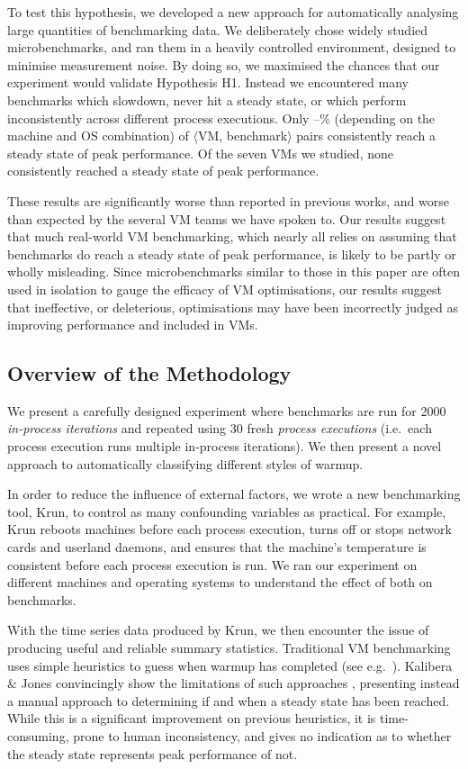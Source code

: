 \documentclass[acmlarge]{acmart}\settopmatter{printfolios=true}
\newcommand{\kalibera}{Kalibera \& Jones\xspace}
\newcommand{\krun}{Krun\xspace}
\newcommand{\vmbpair}{$\langle$VM, benchmark$\rangle$\xspace}
\begin{document}
To test this hypothesis, we developed a new approach for
automatically analysing large quantities of benchmarking data. We deliberately chose
widely studied microbenchmarks, and ran them in a heavily
controlled environment, designed to minimise measurement noise. By doing so, we
maximised the chances that our experiment would validate Hypothesis H1. Instead
we encountered many benchmarks which slowdown, never hit a steady
state, or which perform inconsistently across different process
executions. Only \mintwo--\maxtwo\% (depending on the machine and OS
combination) of \vmbpair pairs consistently reach a steady state of peak
performance. Of the seven VMs we studied, none consistently reached a steady
state of peak performance.

These results are significantly worse than reported in previous works, and worse
than expected by the several VM teams we have spoken to. Our results suggest
that much real-world VM benchmarking, which nearly all relies on assuming
that benchmarks do reach a steady state of peak performance, is likely to be partly or wholly
misleading. Since microbenchmarks similar to those in this paper are often used
in isolation to gauge the efficacy of VM optimisations, our results suggest that
ineffective, or deleterious, optimisations may have been incorrectly judged as
improving performance and included in VMs.


\subsection{Overview of the Methodology}

We present a carefully designed experiment where benchmarks are run for 2000
\emph{in-process iterations} and repeated using 30 fresh \emph{process
executions} (i.e.~each process execution runs multiple in-process iterations).
We then present a novel approach to automatically classifying
different styles of warmup.

In order to reduce the influence of external factors, we wrote a new
benchmarking tool, \krun, to control as many confounding variables as practical.
For example, \krun reboots machines before each process execution, turns off or stops network
cards and userland daemons, and ensures that the
machine's temperature is consistent before each process execution is run.
We ran our experiment on different machines and operating systems to understand
the effect of both on benchmarks.

With the time series data produced by \krun, we then encounter the issue of
producing useful and reliable summary statistics. Traditional VM benchmarking
uses simple heuristics to guess when warmup has completed (see
e.g.~\cite{georges07statistically}). \kalibera convincingly show the limitations of such approaches
\cite{kalibera13rigorous}, presenting instead a manual approach to determining
if and when a steady state has been reached. While this is a significant improvement on
previous heuristics, it is time-consuming, prone to human inconsistency, and gives no
indication as to whether the steady state represents peak performance of not.
\end{document}
